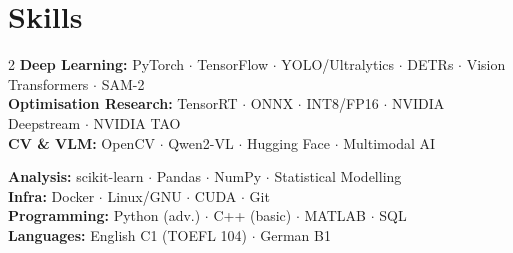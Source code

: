 \documentclass[10pt,a4paper]{article}
\begin{document}
\section{Skills}
\begin{multicols}{2}
\small\noindent
{\color{accent}\bfseries Deep Learning:} PyTorch $\cdot$ TensorFlow $\cdot$ YOLO/Ultralytics $\cdot$ DETRs $\cdot$ Vision Transformers $\cdot$ SAM-2\\[1pt]
{\color{accent}\bfseries Optimisation Research:} TensorRT $\cdot$ ONNX $\cdot$ INT8/FP16 $\cdot$ NVIDIA Deepstream $\cdot$ NVIDIA TAO\\[1pt]
{\color{accent}\bfseries CV \& VLM:} OpenCV $\cdot$ Qwen2-VL $\cdot$ Hugging Face $\cdot$ Multimodal AI

\columnbreak
{\color{accent}\bfseries Analysis:} scikit-learn $\cdot$ Pandas $\cdot$ NumPy $\cdot$ Statistical Modelling\\[1pt]
{\color{accent}\bfseries Infra:} Docker $\cdot$ Linux/GNU $\cdot$ CUDA $\cdot$ Git\\[1pt]
{\color{accent}\bfseries Programming:} Python (adv.) $\cdot$ C++ (basic) $\cdot$ MATLAB $\cdot$ SQL\\[1pt]
{\color{accent}\bfseries Languages:} English C1 (TOEFL 104) $\cdot$ German B1
\end{multicols}
\end{document}
